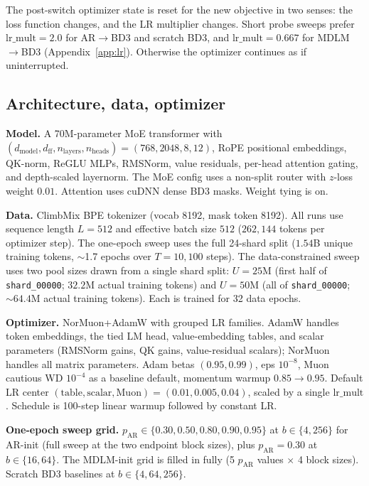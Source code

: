 \documentclass{article}
\newcommand{\pAR}{p_{\mathrm{AR}}}
\begin{document}
The post-switch optimizer state is reset for the new objective in two senses: the loss function changes, and the LR multiplier changes. Short probe sweeps prefer $\mathrm{lr\_mult}{=}2.0$ for AR$\to$BD3 and scratch BD3, and $\mathrm{lr\_mult}{=}0.667$ for MDLM$\to$BD3 (Appendix~\ref{app:lr}). Otherwise the optimizer continues as if uninterrupted.

\subsection{Architecture, data, optimizer}

\textbf{Model.} A 70M-parameter MoE transformer with $(d_{\mathrm{model}}, d_{\mathrm{ff}}, n_{\mathrm{layers}}, n_{\mathrm{heads}}) = (768, 2048, 8, 12)$, RoPE positional embeddings, QK-norm, ReGLU MLPs, RMSNorm, value residuals, per-head attention gating, and depth-scaled layernorm. The MoE config uses a non-split router with $z$-loss weight $0.01$. Attention uses cuDNN dense BD3 masks. Weight tying is on.

\textbf{Data.} ClimbMix BPE tokenizer (vocab 8192, mask token 8192). All runs use sequence length $L{=}512$ and effective batch size $512$ ($262{,}144$ tokens per optimizer step). The one-epoch sweep uses the full 24-shard split ($1.54$B unique training tokens, $\sim$1.7 epochs over $T{=}10{,}100$ steps). The data-constrained sweep uses two pool sizes drawn from a single shard split: $U{=}25$M (first half of \texttt{shard\_00000}; $32.2$M actual training tokens) and $U{=}50$M (all of \texttt{shard\_00000}; ${\sim}64.4$M actual training tokens). Each is trained for 32 data epochs.

\textbf{Optimizer.} NorMuon+AdamW with grouped LR families. AdamW handles token embeddings, the tied LM head, value-embedding tables, and scalar parameters (RMSNorm gains, QK gains, value-residual scalars); NorMuon handles all matrix parameters. Adam betas $(0.95, 0.99)$, eps $10^{-8}$, Muon cautious WD $10^{-4}$ as a baseline default, momentum warmup $0.85 \to 0.95$. Default LR center $(\text{table}, \text{scalar}, \text{Muon}) = (0.01, 0.005, 0.04)$, scaled by a single $\mathrm{lr\_mult}$. Schedule is 100-step linear warmup followed by constant LR.

\textbf{One-epoch sweep grid.} $\pAR \in \{0.30, 0.50, 0.80, 0.90, 0.95\}$ at $b \in \{4, 256\}$ for AR-init (full sweep at the two endpoint block sizes), plus $\pAR{=}0.30$ at $b \in \{16, 64\}$. The MDLM-init grid is filled in fully (5 $\pAR$ values $\times$ 4 block sizes). Scratch BD3 baselines at $b \in \{4, 64, 256\}$.
\end{document}
